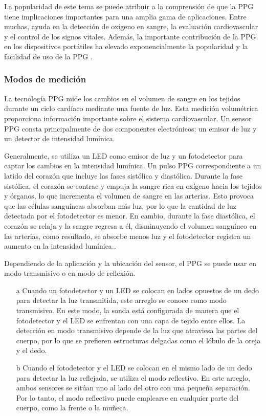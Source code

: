             La popularidad de este tema se puede atribuir a la comprensión de que la PPG tiene implicaciones importantes para una amplia gama de aplicaciones. Entre muchas, ayuda en la detección de oxígeno en sangre, la evaluación cardiovascular y el control de los signos vitales. Además, la importante contribución de la PPG en los dispositivos portátiles ha elevado exponencialmente la popularidad y la facilidad de uso de la PPG \cite{allen_2007}.

        \subsubsection{Modos de medición}
            La tecnología PPG mide los cambios en el volumen de sangre en los tejidos durante un ciclo cardíaco mediante una fuente de luz. Esta medición volumétrica proporciona información importante sobre el sistema cardiovascular. Un sensor PPG consta principalmente de dos componentes electrónicos: un emisor de luz y un detector de intensidad lumínica.

            Generalmente, se utiliza un LED como emisor de luz y un fotodetector para captar los cambios en la intensidad lumínica. Un pulso PPG correspondiente a un latido del corazón que incluye las fases sistólica y diastólica. Durante la fase sistólica, el corazón se contrae y empuja la sangre rica en oxígeno hacia los tejidos y órganos, lo que incrementa el volumen de sangre en las arterias. Esto provoca que las células sanguíneas absorban más luz, por lo que la cantidad de luz detectada por el fotodetector es menor. En cambio, durante la fase diastólica, el corazón se relaja y la sangre regresa a él, disminuyendo el volumen sanguíneo en las arterias, como resultado, se absorbe menos luz y el fotodetector registra un aumento en la intensidad lumínica.\cite{Hiiberia_2023}.

            Dependiendo de la aplicación y la ubicación del sensor, el PPG se puede usar en modo transmisivo o en modo de reflexión.

            \begin{enumerate}
                \item [a] Cuando un fotodetector y un LED se colocan en lados opuestos de un dedo para detectar la luz transmitida, este arreglo se conoce como modo transmisivo. En este modo, la sonda está configurada de manera que el fotodetector y el LED se enfrentan con una capa de tejido entre ellos. La detección en modo transmisivo depende de la luz que atraviesa las partes del cuerpo, por lo que se prefieren estructuras delgadas como el lóbulo de la oreja y el dedo.
                \item [b] Cuando el fotodetector y el LED se colocan en el mismo lado de un dedo para detectar la luz reflejada, se utiliza el modo reflectivo. En este arreglo, ambos sensores se sitúan uno al lado del otro con una pequeña separación. Por lo tanto, el modo reflectivo puede emplearse en cualquier parte del cuerpo, como la frente o la muñeca.
            \end{enumerate}


